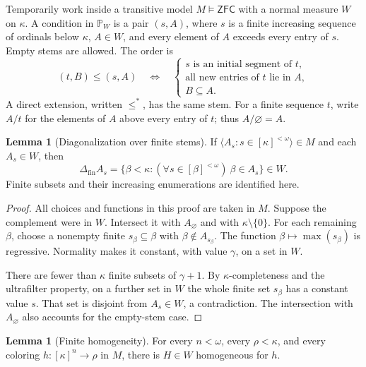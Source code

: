 \documentclass[11pt,letterpaper]{article}
\theoremstyle{definition}
\newtheorem{lemma}[definition]{Lemma}
\numberwithin{equation}{section}
\newcommand{\ZFC}{\mathsf{ZFC}}
\newcommand{\PP}{\mathbb P}
\newcommand{\fin}{\mathrm{fin}}
\newcommand{\seq}[1]{\langle #1\rangle}
\begin{document}
Temporarily work inside a transitive model $M\models\ZFC$ with a normal
measure $W$ on $\kappa$. A condition in $\PP_W$ is a pair $(s,A)$, where
$s$ is a finite increasing sequence of ordinals below $\kappa$,
$A\in W$, and every element of $A$ exceeds every entry of $s$. Empty
stems are allowed. The order is
\[
 (t,B)\le(s,A)
 \quad\Longleftrightarrow\quad
 \begin{cases}
  s\text{ is an initial segment of }t,\\
  \text{all new entries of }t\text{ lie in }A,\\
  B\subseteq A.
 \end{cases}
\]
A direct extension, written $\le^*$, has the same stem. For a finite
sequence $t$, write $A/t$ for the elements of $A$ above every entry of
$t$; thus $A/\varnothing=A$.

\begin{lemma}[Diagonalization over finite stems]\label{lem:diag}
If $\seq{A_s:s\in[\kappa]^{<\omega}}\in M$ and each $A_s\in W$, then
\[
 \Delta_{\fin} A_s
 =\{\beta<\kappa:(\forall s\in[\beta]^{<\omega})\ \beta\in A_s\}
 \in W.
\]
Finite subsets and their increasing enumerations are identified here.
\end{lemma}

\begin{proof}
All choices and functions in this proof are taken in $M$. Suppose the
complement were in $W$. Intersect it with $A_\varnothing$ and with
$\kappa\setminus\{0\}$. For each remaining $\beta$, choose a nonempty
finite $s_\beta\subseteq\beta$ with $\beta\notin A_{s_\beta}$. The
function $\beta\mapsto\max(s_\beta)$ is regressive. Normality makes it
constant, with value $\gamma$, on a set in $W$.

There are fewer than $\kappa$ finite subsets of $\gamma+1$. By
$\kappa$-completeness and the ultrafilter property, on a further set in
$W$ the whole finite set $s_\beta$ has a constant value $s$. That set
is disjoint from $A_s\in W$, a contradiction. The intersection with
$A_\varnothing$ also accounts for the empty-stem case.
\end{proof}

\begin{lemma}[Finite homogeneity]\label{lem:ramsey}
For every $n<\omega$, every $\rho<\kappa$, and every coloring
$h:[\kappa]^n\to\rho$ in $M$, there is $H\in W$ homogeneous for $h$.
\end{lemma}
\end{document}
